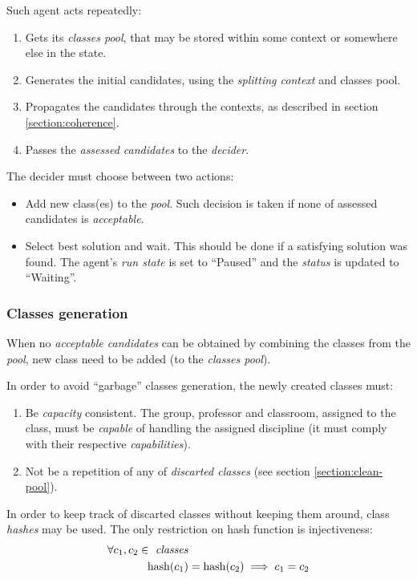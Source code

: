\noindent
Such agent acts repeatedly:
\begin{enumerate}
\item Gets its \emph{classes pool}, that may be stored within some context or
  somewhere else in the state.
\item Generates the initial candidates, using the \emph{splitting context} and
  classes pool.
\item Propagates the candidates through the contexts, as described in section
  \ref{section:coherence}.
\item Passes the \emph{assessed candidates} to the \emph{decider}.
\end{enumerate}

The decider must choose between two actions:
\begin{itemize}
\item Add new class(es) to the \emph{pool}. Such decision is taken if
  none of assessed candidates is \emph{acceptable}.
\item Select best solution and wait. This should be done if a satisfying
  solution was found. The agent's \emph{run state} is set to ``Paused'' and
  the \emph{status} is updated to ``Waiting''.
\end{itemize}

\subsubsection{Classes generation}
\label{section:class-gen}
When no \emph{acceptable candidates} can be obtained by combining the classes
from the \emph{pool}, new class need to be added (to the \emph{classes pool}).

In order to avoid ``garbage'' classes generation, the newly created classes must:
\begin{enumerate}[(1)]
  \item Be \emph{capacity} consistent. The group, professor and classroom,
    assigned to the class, must be \emph{capable} of handling the assigned discipline
    (it must comply with their respective \emph{capabilities}).
  \item Not be a repetition of any of \emph{discarted classes}
    (see section \ref{section:clean-pool}).
\end{enumerate}

In order to keep track of discarted classes without keeping them around,
class \emph{hashes} may be used. The only restriction on hash function is
injectiveness:
\begin{align*}
  \forall c_1, c_2 \in \text{ \emph{classes}} & \\
  \mathrm{hash}(c_1) &= \mathrm{hash}(c_2) \implies c_1 = c_2
\end{align*}

